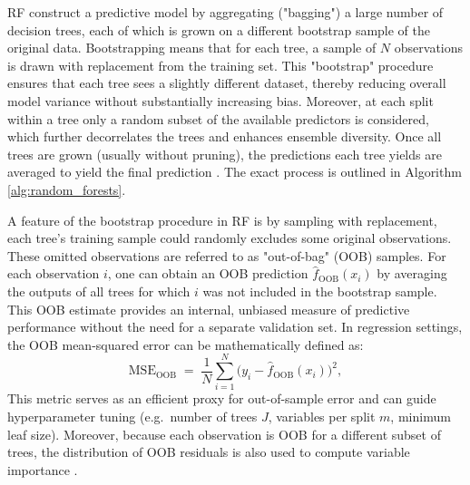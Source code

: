         

RF construct a predictive model by aggregating ("bagging") a large number of decision trees, each of which is grown on a different bootstrap sample of the original data. Bootstrapping means that for each tree, a sample of $N$ observations is drawn with replacement from the training set. This "bootstrap" procedure ensures that each tree sees a slightly different dataset, thereby reducing overall model variance without substantially increasing bias. Moreover, at each split within a tree only a random subset of the available predictors is considered, which further decorrelates the trees and enhances ensemble diversity. Once all trees are grown (usually without pruning), the predictions each tree yields are averaged to yield the final prediction \cite{cutler_2012}. The exact process is outlined in Algorithm \ref{alg:random_forests}. 

A feature of the bootstrap procedure in RF is by sampling with replacement, each tree's training sample could randomly excludes some original observations. These omitted observations are referred to as "out-of-bag" (OOB) samples. For each observation \(i\), one can obtain an OOB prediction \(\hat f_{\mathrm{OOB}}(x_i)\) by averaging the outputs of all trees for which \(i\) was not included in the bootstrap sample. This OOB estimate provides an internal, unbiased measure of predictive performance without the need for a separate validation set. In regression settings, the OOB mean-squared error can be mathematically defined as:
\begin{equation}
\mathrm{MSE}_{\mathrm{OOB}} \;=\; \frac{1}{N}\sum_{i=1}^N\bigl(y_i - \hat f_{\mathrm{OOB}}(x_i)\bigr)^2,
\end{equation}
This metric serves as an efficient proxy for out-of-sample error and can guide hyperparameter tuning (e.g.\ number of trees \(J\), variables per split \(m\), minimum leaf size). Moreover, because each observation is OOB for a different subset of trees, the distribution of OOB residuals is also used to compute variable importance \cite{cutler_2012}. 



